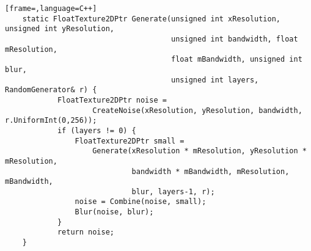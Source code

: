 \begin{lstlisting}[frame=,language=C++]
    static FloatTexture2DPtr Generate(unsigned int xResolution, unsigned int yResolution,
                                      unsigned int bandwidth, float mResolution,
                                      float mBandwidth, unsigned int blur,
                                      unsigned int layers, RandomGenerator& r) {
            FloatTexture2DPtr noise =
                    CreateNoise(xResolution, yResolution, bandwidth, r.UniformInt(0,256));
            if (layers != 0) {
                FloatTexture2DPtr small = 
                    Generate(xResolution * mResolution, yResolution * mResolution, 
                             bandwidth * mBandwidth, mResolution, mBandwidth,
                             blur, layers-1, r);
                noise = Combine(noise, small);
                Blur(noise, blur);
            }
            return noise;
    }
\end{lstlisting}

